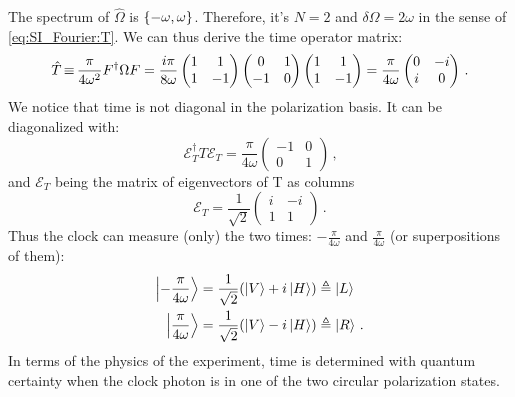 The spectrum of $\hat{\Omega}$ is $\qty{-\omega, \omega}$.
Therefore, it's $N=2$ and $\delta\Omega = 2\omega$ in the sense of
\eqref{eq:SI_Fourier:T}.
We can thus derive the time operator matrix:
\begin{equation}
  \hat{T}
  \operatorname*{\equiv}
  \frac{\pi}{4\omega^2} F^{\dagger} \Omega F
  =
  \frac{i\pi}{8\omega}
  \begin{pmatrix}
    1 & 1 \\
    1 & -1
  \end{pmatrix}
  \begin{pmatrix}
    0 & 1 \\
   -1 & 0
  \end{pmatrix}
  \begin{pmatrix}
    1 & 1 \\
    1 & -1
  \end{pmatrix}
  =
  \frac{\pi}{4\omega}
  \begin{pmatrix}
    0 & -i \\
    i &  0
  \end{pmatrix}
  \,\text{.}
\end{equation}
We notice that time is not diagonal in the polarization basis.
It can be diagonalized with:
\begin{equation}\label{eq:moreva_diag_T}
  \mathcal{E}_T^{\dagger} T \mathcal{E}_T
  =
\frac{\pi}{4\omega}
\begin{pmatrix}
  -1  & 0 \\
  0   & 1
\end{pmatrix}
\,\text{,}
\end{equation}
and $\mathcal{E}_T$ being the matrix of eigenvectors of T as columns
\begin{equation}
  \mathcal{E}_T
  =
  \frac{1}{\sqrt{2}}
  \begin{pmatrix}
    i & -i \\
    1 & 1
  \end{pmatrix}
  \,\text{.}
\end{equation}
Thus the clock can measure (only) the two times: $-\frac{\pi}{4\omega}$ and $\frac{\pi}{4\omega}$
(or superpositions of them):
\begin{align}
  \ket{-\frac{\pi}{4\omega}} &= \frac{1}{\sqrt{2}} \qty(\ket{V}+i\ket{H}) \triangleq \ket{L} \\
  \ket{ \frac{\pi}{4\omega}} &= \frac{1}{\sqrt{2}} \qty(\ket{V}-i\ket{H}) \triangleq \ket{R} \, \text{.}
\end{align}
In terms of the physics of the experiment,
time is determined with quantum certainty when the clock photon is
in one of the two circular polarization states.


